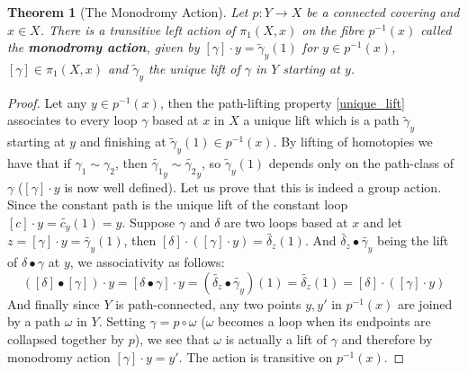 \documentclass{article}
\theoremstyle{plain}
\newtheorem{theorem}{Theorem}[subsection]
\theoremstyle{definition}
\begin{document}
\begin{theorem}[The Monodromy Action]
    Let $p:Y\rightarrow X$ be a connected covering and $x\in X$. There is a transitive left action of $\pi_1(X,x)$ on the fibre $p^{-1}(x)$ called the \textbf{monodromy action}, given by $[\gamma]\cdot y = \widetilde{\gamma}_y(1)$ for $y\in p^{-1}(x)$, $[\gamma]\in\pi_1(X,x)$ and $\widetilde{\gamma}_y$ the unique lift of $\gamma$ in $Y$ starting at $y$.
\end{theorem}
\begin{proof}
    Let any $y\in p^{-1}(x)$, then the path-lifting property \ref{unique_lift} associates to every loop $\gamma$ based at $x$ in $X$ a unique lift which is a path $\widetilde{\gamma}_y$ starting at $y$ and finishing at $\widetilde{\gamma}_y(1)\in p^{-1}(x)$.
    By lifting of homotopies we have that if $\gamma_1 \sim \gamma_2$, then $\widetilde{\gamma_1}_y \sim \widetilde{\gamma_2}_y$, so $\widetilde{\gamma}_y(1)$ depends only on the path-class of $\gamma$ ($[\gamma]\cdot y$ is now well defined).
    Let us prove that this is indeed a group action.
    Since the constant path is the unique lift of the constant loop $[c] \cdot y = \widetilde{c_y}(1) = y$.
    Suppose $\gamma$ and $\delta$ are two loops based at $x$ and let $z = [\gamma]\cdot y = \widetilde{\gamma_y}(1)$, then $[\delta]\cdot ([\gamma]\cdot y) = \widetilde{\delta_z}(1)$. 
    And $\widetilde{\delta_z}\bullet \widetilde{\gamma_y}$ being the lift of $\delta\bullet\gamma$ at $y$, we associativity as follows: 
    $$([\delta]\bullet[\gamma])\cdot y = [\delta\bullet\gamma]\cdot y = (\widetilde{\delta_z}\bullet\widetilde{\gamma_y})(1) = \widetilde{\delta_z}(1) = [\delta]\cdot ([\gamma]\cdot y)$$
    And finally since $Y$ is path-connected, any two points $y, y'$ in $p^{-1}(x)$ are joined by a path $\omega$ in $Y$. 
    Setting $\gamma = p \circ \omega$ ($\omega$ becomes a loop when its endpoints are collapsed together by $p$), we see that $\omega$ is actually a lift of $\gamma$ and therefore by monodromy action $[\gamma]\cdot y = y'$. The action is transitive on $p^{-1}(x)$.
\end{proof}

\end{document}
